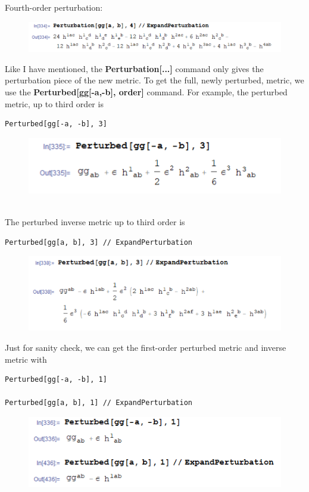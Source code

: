 \documentclass{book}
\theoremstyle{definition}
\begin{document}
Fourth-order perturbation:
\begin{figure}[!htb]
	\includegraphics[scale=0.25]{fourth-pert}
\end{figure}



Like I have mentioned, the \textbf{Perturbation[...]} command only gives the perturbation piece of the new metric. To get the full, newly perturbed, metric, we use the \textbf{Perturbed[gg[-a,-b], order]} command. For example, the perturbed metric, up to third order is
\begin{lstlisting}
Perturbed[gg[-a, -b], 3]
\end{lstlisting}
\begin{figure}[!htb]
	\includegraphics[scale=0.3]{third-perted}
\end{figure}
$\,$\\
The perturbed inverse metric up to third order is
\begin{lstlisting}
Perturbed[gg[a, b], 3] // ExpandPerturbation
\end{lstlisting}
\begin{figure}[!htb]
	\includegraphics[scale=0.3]{third-ptbr}
\end{figure}




Just for sanity check, we can get the first-order perturbed metric and inverse metric with
\begin{lstlisting}
Perturbed[gg[-a, -b], 1]

Perturbed[gg[a, b], 1] // ExpandPerturbation
\end{lstlisting}
\begin{figure}[!htb]
	\includegraphics[scale=0.3]{first-pert}
\end{figure}
\end{document}
